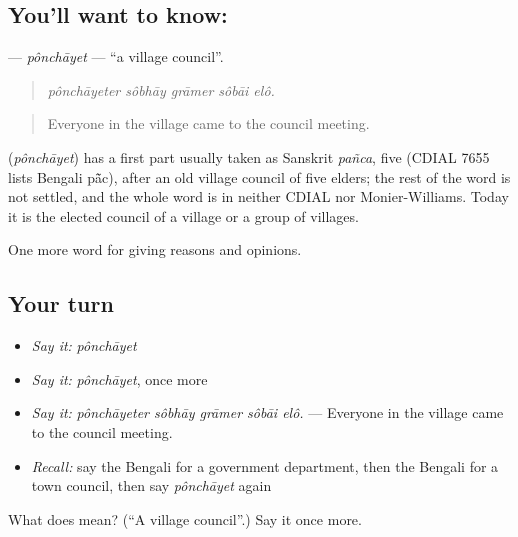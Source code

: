 \subsection*{You'll want to know: }
\textbf{} — \emph{pônchāyet} — \textquotedblleft{}a village council\textquotedblright{}.

\begin{quote}
    
\end{quote}

\begin{quote}
\emph{pônchāyeter sôbhāy grāmer sôbāi elô.}
\end{quote}

\begin{quote}
Everyone in the village came to the council meeting.
\end{quote}

\begin{cousinweb}
\textbf{} (\emph{pônchāyet}) has a first part usually taken as Sanskrit \emph{pañca}, five (CDIAL 7655 lists Bengali pā̃c), after an old village council of five elders; the rest of the word is not settled, and the whole word is in neither CDIAL nor Monier-Williams. Today it is the elected council of a village or a group of villages.
\end{cousinweb}

\begin{grammarlens}[title={What you've built}]
One more word for giving reasons and opinions.
\end{grammarlens}

\subsection*{Your turn}
\begin{itemize}
\raggedright
  \item \emph{Say it:} \emph{pônchāyet}
  \item \emph{Say it:} \emph{pônchāyet}, once more
  \item \emph{Say it:} \emph{pônchāyeter sôbhāy grāmer sôbāi elô.} — Everyone in the village came to the council meeting.
  \item \emph{Recall:} say the Bengali for a government department, then the Bengali for a town council, then say \emph{pônchāyet} again
\end{itemize}

\begin{tcolorbox}[breakable,colback=teal!4,colframe=teal!35!black,title={Before you move on}]
What does  mean? (\textquotedblleft{}A village council\textquotedblright{}.) Say it once more.
\end{tcolorbox}
